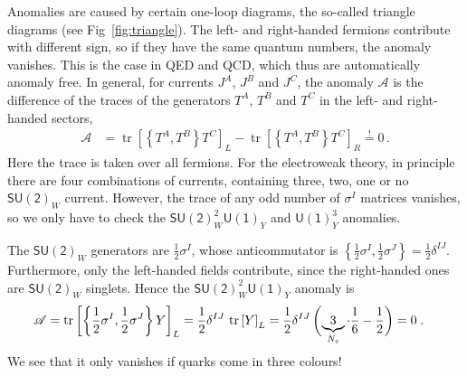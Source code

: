 \documentclass[12pt]{report}
\def\clap#1{\hbox to 0pt{\hss#1\hss}}
\def\mathclap{\mathpalette\mathclapinternal}
\def\mathclapinternal#1#2{\clap{$\mathsurround=0pt#1{#2}$}}
\DeclareMathOperator{\tr}{tr}
\newcommand{\2}{\ensuremath{\sqrt{2}\,}}
\begin{document}
{        Anomalies are caused by certain one-loop diagrams, the so-called triangle diagrams
         (see Fig~\ref{fig:triangle}). The left- and right-handed fermions
        contribute with different sign, so if they have the same quantum numbers, the anomaly
        vanishes. This is the case in QED and QCD, which thus are automatically anomaly free. In
        general, for currents $J^A$, $J^B$ and $J^C$, the anomaly $\mathscr{A}$ is 
        the difference of the traces of the generators $T^A$, $T^B$ and $T^C$ in the
        left- and right-handed sectors,
        \begin{align}
          \mathscr{A} &= \tr \left[\left\{T^A, T^B\right\} T^C\right]_L - \tr
          \left[\left\{T^A, T^B\right\} T^C\right]_R \stackrel{!}{=} 0\,.
        \end{align}
        Here the trace is taken over all fermions. 
        For the electroweak theory, in principle there are four combinations of currents, containing
        three, two, one or no $\mathsf{SU(2)}_W$ current. However, the trace of any odd number of
        $\sigma^I$ matrices vanishes, so we only have to check the $\mathsf{SU(2)}_W^2
        \mathsf{U(1)}_Y$ and $\mathsf{U(1)}_Y^3$ anomalies.
        
        The $\mathsf{SU(2)}_W$ generators are $\frac{1}{2} \sigma^I$, whose anticommutator is
        $\left\{\frac{1}{2} \sigma^I, \frac{1}{2} \sigma^J\right\}
        =\frac{1}{2}\delta^{IJ}$. Furthermore, only the left-handed fields contribute, since the
        right-handed ones are $\mathsf{SU(2)}_W$ singlets. Hence the
        $\mathsf{SU(2)}_W^2\mathsf{U(1)}_Y$ anomaly is 
        \begin{align}
          \mathscr{A} &= \tr \left[\left\{\frac{1}{2} \sigma^I, \frac{1}{2} \sigma^J\right\}
            Y\right]_L = \frac{1}{2}\delta^{IJ}\, \tr\left[Y\right]_L =\frac{1}{2}\delta^{IJ}\,
          \biggl(\underbrace{3}_{\mathclap{N_c}}\cdot \frac{1}{6} -\frac{1}{2}\biggr)=0\;.
        \end{align}
        We see that it only vanishes if quarks come in three colours!

}
\end{document}
